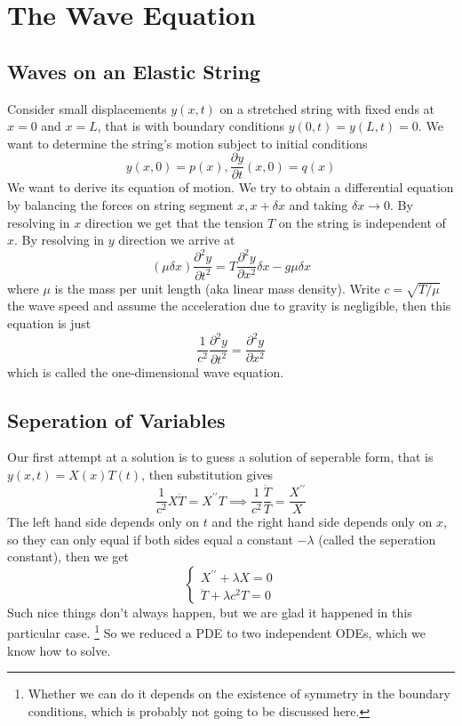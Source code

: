 \section{The Wave Equation}
\subsection{Waves on an Elastic String}
Consider small displacements $y(x,t)$ on a stretched string with fixed ends at $x=0$ and $x=L$, that is with boundary conditions $y(0,t)=y(L,t)=0$.
We want to determine the string's motion subject to initial conditions
$$y(x,0)=p(x),\frac{\partial y}{\partial t}(x,0)=q(x)$$
We want to derive its equation of motion.
We try to obtain a differential equation by balancing the forces on string segment $x,x+\delta x$ and taking $\delta x\to 0$.
By resolving in $x$ direction we get that the tension $T$ on the string is independent of $x$.
By resolving in $y$ direction we arrive at
$$(\mu\delta x)\frac{\partial^2y}{\partial t^2}=T\frac{\partial^2y}{\partial x^2}\delta x-g\mu\delta x$$
where $\mu$ is the mass per unit length (aka linear mass density).
Write $c=\sqrt{T/\mu}$ the wave speed and assume the acceleration due to gravity is negligible, then this equation is just
$$\frac{1}{c^2}\frac{\partial^2y}{\partial t^2}=\frac{\partial^2y}{\partial x^2}$$
which is called the one-dimensional wave equation.
\subsection{Seperation of Variables}
Our first attempt at a solution is to guess a solution of seperable form, that is $y(x,t)=X(x)T(t)$, then substitution gives
$$\frac{1}{c^2}X\ddot{T}=X^{\prime\prime}T\implies \frac{1}{c^2}\frac{\ddot{T}}{T}=\frac{X^{\prime\prime}}{X}$$
The left hand side depends only on $t$ and the right hand side depends only on $x$, so they can only equal if both sides equal a constant $-\lambda$ (called the seperation constant), then we get
$$\begin{cases}
    X^{\prime\prime}+\lambda X=0\\
    \ddot{T}+\lambda c^2T=0
\end{cases}$$
Such nice things don't always happen, but we are glad it happened in this particular case.
\footnote{Whether we can do it depends on the existence of symmetry in the boundary conditions, which is probably not going to be discussed here.}
So we reduced a PDE to two independent ODEs, which we know how to solve.
